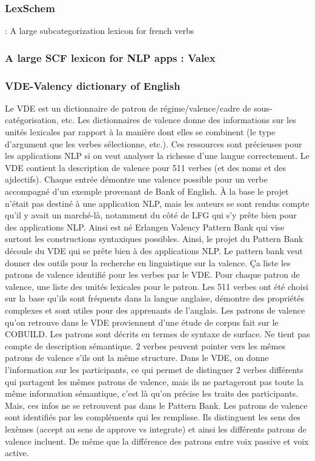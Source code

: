 \subsubsection{LexSchem} :  A large subcategorization lexicon for french verbs \citep{MESSIANT08.142}

\subsubsection{A large SCF lexicon for NLP apps : Valex} \citep{Korhonenlargesubcategorizationlexicon2006}

\subsubsection{VDE-Valency dictionary of English}

Le VDE est un dictionnaire de patron de régime/valence/cadre de sous-catégorisation, etc.  Les dictionnaires de valence donne des informations sur les unités lexicales par rapport à la manière dont elles se combinent (le type d'argument que les verbes sélectionne, etc.). Ces ressources sont précieuses pour les applications NLP si on veut analyser la richesse d'une langue correctement. \citep{PROISL10.62}Le VDE contient la description de valence pour 511 verbes (et des noms et des ajdectifs). Chaque entrée démontre une valence possible pour un verbe accompagné d'un exemple provenant de Bank of English. À la base le projet n'était pas destiné à une application NLP, mais les auteurs se sont rendus compte qu'il y avait un marché-là, notamment du côté de LFG qui s'y prête bien pour des applications NLP. Ainsi est né Erlangen Valency Pattern Bank qui vise surtout les constructions syntaxiques possibles. Ainsi, le projet du Pattern Bank découle du VDE qui se prête bien à des applications NLP. Le pattern bank veut donner des outils pour la recherche en linguistique sur la valence. Ça liste les patrons de valence identifié pour les verbes par le VDE. Pour chaque patron de valence, une liste des unités lexicales pour le patron.  Les 511 verbes ont été choisi sur la base qu'ils sont fréquents dans la langue anglaise, démontre des propriétés complexes et sont utiles pour des apprenants de l'anglais. Les patrons de valence qu'on retrouve dans le VDE proviennent d'une étude de corpus fait sur le COBUILD. Les patrons sont décrits en termes de syntaxe de surface. Ne tient pas compte de description sémantique. 2 verbes peuvent pointer vers les mêmes patrons de valence s'ils ont la même structure. Dans le VDE, on donne l'information sur les participants, ce qui permet de distinguer 2 verbes différents qui partagent les mêmes patrons de valence, mais ils ne partageront pas toute la même information sémantique, c'est là qu'on précise les traits des participants. Mais, ces infos ne se retrouvent pas dans le Pattern Bank. Les patrons de valence sont identifiés par les compléments qui les remplisse. Ils distinguent les sens des lexèmes (accept au sens de approve vs integrate) et ainsi les différents patrons de valence incluent. De même que la différence des patrons entre voix passive et voix active. 

